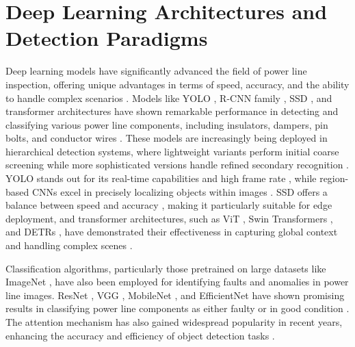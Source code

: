 \section{Deep Learning Architectures and Detection Paradigms}\label{sec:architectures}

Deep learning models have significantly advanced the field of power line inspection, offering unique advantages in terms of speed, accuracy, and the ability to handle complex scenarios \cite{sundaram_deep_2021}. Models like YOLO \cite{redmon_you_2016, redmon_yolo9000_2016, redmon_yolov3_2018, bochkovskiy_yolov4_2020, jocher_yolo_2023}, R-CNN family \cite{girshick_rich_2014, girshick_fast_2015, ren_faster_2016}, SSD \cite{liu_ssd_2016}, and transformer architectures \cite{dosovitskiy2020image, liu2021swintransformerhierarchicalvision, carion2020end} have shown remarkable performance in detecting and classifying various power line components, including insulators, dampers, pin bolts, and conductor wires \cite{sadykova2019yolo, singh_2023_interpretable, zhang_cloud_edge_2020, wei_online_2022, zhai_hybrid_2021, rong_intelligent_2021, miao_insulator_2019, nguyen_intelligent_2019, dong_improved_2023, zhang_pa_detr_2023, jain2024transfer}. These models are increasingly being deployed in hierarchical detection systems, where lightweight variants perform initial coarse screening while more sophisticated versions handle refined secondary recognition \cite{wei_online_2022}. YOLO stands out for its real-time capabilities and high frame rate \cite{li_improved_2022}, while region-based CNNs excel in precisely localizing objects within images \cite{bharati2020deep}. SSD offers a balance between speed and accuracy \cite{huang2017speed}, making it particularly suitable for edge deployment, and transformer architectures, such as ViT \cite{dosovitskiy2020image}, Swin Transformers \cite{liu2021swintransformerhierarchicalvision}, and DETRs \cite{carion2020end}, have demonstrated their effectiveness in capturing global context and handling complex scenes \cite{han2022survey, dong_improved_2023, zhang_pa_detr_2023, jain2024transfer}.

Classification algorithms, particularly those pretrained on large datasets like ImageNet \cite{5206848}, have also been employed for identifying faults and anomalies in power line images. ResNet \cite{he_2023_deep}, VGG \cite{simonyan2014very}, MobileNet \cite{howard2017mobilenets}, and EfficientNet \cite{tan2019efficientnet} have shown promising results in classifying power line components as either faulty or in good condition \cite{wei_online_2022, cao_accurate_2023, luo_ultrasmall_2023, stefenon_semi_protopnet_2022, qiu_lightweight_2023, li_improved_2022, odo_aerial_2021, li_pin_2022}. The attention mechanism \cite{vaswani2017attention} has also gained widespread popularity in recent years, enhancing the accuracy and efficiency of object detection tasks \cite{cao_accurate_2023, fan_2019_few, kong_context_2018}. 

